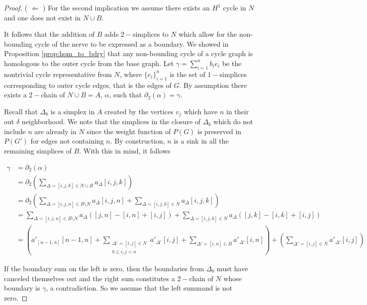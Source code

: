 \documentclass[pdflatex,bst/sn-mathphys-num]{sn-jnl}%
\theoremstyle{thmstyleone}%
\theoremstyle{definition}
\theoremstyle{thmstyletwo}%
\theoremstyle{thmstylethree}%
\begin{document}
\begin{proof}
    ( $\Longleftarrow$ ) For the second implication we assume there exists an $H^1$ cycle in $N$ and one does not exist in $N\cup B$. 
    
     It follows that the addition of $B$ adds $2-$simplices to $N$ which allow for the non-bounding cycle of the nerve to be expressed as a boundary. We showed in Proposition \ref{prop:hom_to_bdry} that any non-bounding cycle of a cycle graph is homologous to the outer cycle from the base graph. Let $\gamma=\sum_{i=1}^n b_i e_i$ be the nontrivial cycle representative from $N$, where $\{e_i\}_{i=1}^n$ is the set of $1-$simplices corresponding to outer cycle edges, that is the edges of $G$. By assumption there exists a $2-$chain of $N\cup B = A$, $\alpha$, such that $\partial_2(\alpha)=\gamma$. 
     
     Recall that $\Delta_b$ is a simplex in $A$ created by the vertices $v_j$ which have $n$ in their out $\delta$ neighborhood. We note that the simplices in the closure of $\Delta_b$ which do not include $n$ are already in $N$ since the weight function of $P(G)$ is preserved in $P(G')$ for edges not containing $n$. By construction, $n$ is a sink in all the remaining simplices of $B$. With this in mind, it follows

    \begin{align*}
        \gamma &= \partial_2\left(\alpha\right)\\
        &= 
        \partial_2\left(\sum_{\Delta=[i,j,k]\in N\cup B}a_{\Delta} [i,j,k]\right)\\
        &= 
        \partial_2\left(
        \sum_{\Delta=[i,j,n]\in B\setminus N}a_{\Delta} [i,j,n]
        +
        \sum_{\Delta=[i,j,k]\in N}a_{\Delta} [i,j,k]
        \right)\\
        &=
        \sum_{\Delta=[i,j,n]\in B\setminus N}a_{\Delta} ([j,n]-[i,n]+[i,j])
        +
        \sum_{\Delta=[i,j,k]\in N}a_{\Delta} ([j,k]-[i,k]+[i,j])\\
        &=
        \left(a'_{[n-1,n]}[n-1,n]
            +
            \sum_{\substack{\Delta'=[i,j]\in N\\
            b\leq  i,j< n   }}a'_{\Delta'} [i,j]
            +
            \sum_{\Delta'=[i,n]\in B}a'_{\Delta'} [i,n]
        \right)
        +
        \left(
            \sum_{\Delta'=[i,j]\in N}a'_{\Delta'} [i,j]
        \right)
    \end{align*}

    If the boundary sum on the left is zero, then the boundaries from $\Delta_b$ must have canceled themselves out and the right sum constitutes a $2-$chain of $N$ whose boundary is $\gamma$, a contradiction. So we assume that the left summand is not zero. 
    

\end{proof}
\end{document}
